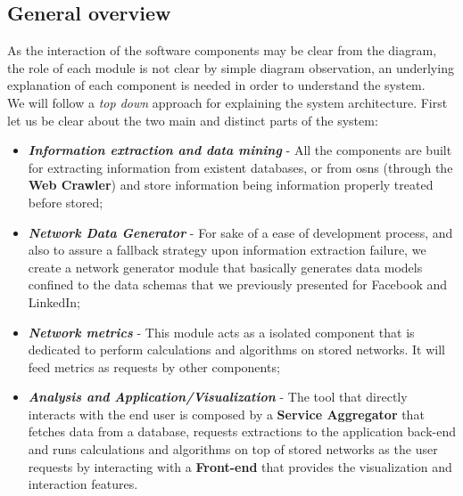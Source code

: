 \subsection{General overview}
As the interaction of the software components may be clear from the diagram, the role of each module is not clear by simple
diagram observation, an underlying explanation of each component is needed in order to understand the system.\\
\indent We will follow a \textit{top down} approach for explaining the system architecture. First let us be clear about the two
main and distinct parts of the system:
\begin{itemize}
    \item \textbf{\textit{Information extraction and data mining}} - All the components are built for extracting information
    from existent databases, or from \glspl{osn} (through the \textbf{Web Crawler}) and store information being information properly treated before stored;
    \item \textbf{\textit{Network Data Generator}} - For sake of a ease of development process, and also to assure a fallback strategy upon information extraction failure, we create a network generator module that basically generates data models confined to the data schemas that we previously presented for Facebook and LinkedIn;
    \item \textbf{\textit{Network metrics}} - This module acts as a isolated component that is dedicated to perform calculations and algorithms on stored networks. It will feed metrics as requests by other components;
    \item \textbf{\textit{Analysis and Application/Visualization}} - The tool that directly interacts with the end user is composed by a \textbf{Service Aggregator} that fetches data from a database, requests extractions to the application back-end and runs calculations and algorithms on top of stored networks as the user requests by interacting with a \textbf{Front-end} that provides the visualization and interaction features.
\end{itemize}

